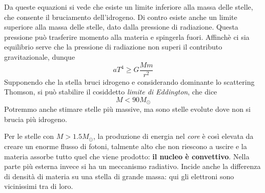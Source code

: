 \documentclass[a4paper,11pt]{article}
\begin{document}
Da queste equazioni si vede che esiste un limite inferiore alla massa delle stelle, che consente il bruciamento dell'idrogeno. Di contro esiste anche un limite superiore alla massa delle stelle, dato dalla pressione di radiazione. Questa pressione può trasferire momento alla materia e spingerla fuori. Affinchè ci sia equilibrio serve che la pressione di radiazione non superi il contributo gravitazionale, dunque
$$aT^4\geq G\frac{Mm}{r^2}$$
Supponendo che la stella bruci idrogeno e considerando dominante lo scattering Thomson, si può stabilire il cosiddetto \textit{limite di Eddington}, che dice
$$M<90M_{\odot}$$ Potremmo anche stimare stelle più massive, ma sono stelle evolute dove non si brucia più idrogeno.

Per le stelle con $M>1.5M_{\odot}$, la produzione di energia nel \textit{core} è così elevata da creare un enorme flusso di fotoni, talmente alto che non riescono a uscire e la materia assorbe tutto quel che viene prodotto: \textbf{il nucleo è convettivo}. Nella parte più esterna invece si ha un meccanismo radiativo. Incide anche la differenza di densità di materia su una stella di grande massa: qui gli elettroni sono vicinissimi tra di loro.
\end{document}
